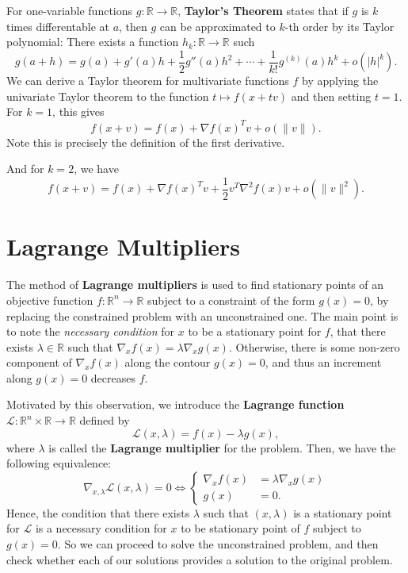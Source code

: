 \documentclass[reqno]{amsart}
\numberwithin{equation}{section}
\begin{document}
For one-variable functions $g : \mathbb R \to \mathbb R$, \textbf{Taylor's Theorem} states
that if $g$ is $k$ times differentable at $a$, then $g$ can be approximated to $k$-th
order by its Taylor polynomial: There exists a function $h_k : \mathbb R \to \mathbb R$ such
$$
    g(a+h) = g(a) + g'(a)h + \frac12 g''(a)h^2 + \cdots + \frac{1}{k!} g^{(k)}(a) h^k +
        o(|h|^k).
$$
We can derive a Taylor theorem for multivariate functions $f$ by applying the univariate Taylor
theorem to the function $t \mapsto f(x + tv)$ and then setting $t=1$. For $k=1$, this gives
$$
    f(x + v) = f(x) + \nabla f(x)^T v + o(\|v\|).
$$
Note this is precisely the definition of the first derivative.

And for $k=2$, we have
$$
    f(x + v) = f(x) + \nabla f(x)^T v + \frac{1}{2} v^T \nabla^2 f(x) v + o(\|v\|^2).
$$

\section{Lagrange Multipliers}

The method of \textbf{Lagrange multipliers} is used to find stationary points of an objective
function $f: \mathbb R^n \to \mathbb R$ subject to a constraint of the form $g(x) = 0$,
by replacing the constrained problem with an unconstrained one.
The main point is to note the \emph{necessary condition}
for $x$ to be a stationary point for $f$, that there exists $\lambda \in \mathbb R$ such that
$\nabla_x f(x) = \lambda \nabla_x g(x)$. Otherwise, there is some non-zero component
of $\nabla_x f(x)$ along the contour $g(x) = 0$, and thus an increment along $g(x) = 0$
decreases $f$.

Motivated by this observation, we introduce the \textbf{Lagrange function} $\mathcal L :
\mathbb R^n \times \mathbb R \to \mathbb R$ defined by
$$
\mathcal L(x,\lambda) = f(x) - \lambda g(x),
$$
where $\lambda$ is called the \textbf{Lagrange multiplier} for the problem. Then, we have
the following equivalence:
$$
    \nabla_{x, \lambda} \mathcal L (x,\lambda) = 0 \iff
    \begin{cases}
        \nabla_x f(x) &= \lambda \nabla_x g(x) \\
        g(x)          &= 0.
    \end{cases}
$$
Hence, the condition that there exists $\lambda$ such that $(x,\lambda)$ is a stationary point
for $\mathcal L$ is a necessary condition for $x$ to be stationary point of $f$ subject to
$g(x) = 0$. So we can proceed to solve the unconstrained problem, and then check whether each of
our solutions provides a solution to the original problem.
\end{document}
